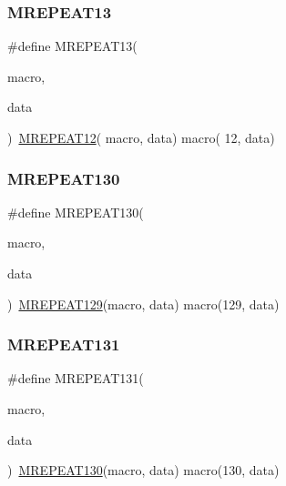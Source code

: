 \mbox{\label{group__group__sam0__utils__mrepeat_ga235cc5c4e4fb84c9d44ee4b5b5b4a7d1}} 
\subsubsection{\texorpdfstring{MREPEAT13}{MREPEAT13}}
{\footnotesize\ttfamily \#define M\+R\+E\+P\+E\+A\+T13(\begin{DoxyParamCaption}\item[{}]{macro,  }\item[{}]{data }\end{DoxyParamCaption})~\mbox{\hyperlink{group__group__sam0__utils__mrepeat_ga5e8405725939e1548f4c09088bb9284a}{M\+R\+E\+P\+E\+A\+T12}}( macro, data)   macro( 12, data)}

\mbox{\label{group__group__sam0__utils__mrepeat_ga4191567eafa92f00f44b2d84415d6364}} 
\subsubsection{\texorpdfstring{MREPEAT130}{MREPEAT130}}
{\footnotesize\ttfamily \#define M\+R\+E\+P\+E\+A\+T130(\begin{DoxyParamCaption}\item[{}]{macro,  }\item[{}]{data }\end{DoxyParamCaption})~\mbox{\hyperlink{group__group__sam0__utils__mrepeat_ga7842d9600b24d29d82636afa3f0ca4b8}{M\+R\+E\+P\+E\+A\+T129}}(macro, data)   macro(129, data)}

\mbox{\label{group__group__sam0__utils__mrepeat_ga6171f95e704d4bc6b92bca58bf15445c}} 
\subsubsection{\texorpdfstring{MREPEAT131}{MREPEAT131}}
{\footnotesize\ttfamily \#define M\+R\+E\+P\+E\+A\+T131(\begin{DoxyParamCaption}\item[{}]{macro,  }\item[{}]{data }\end{DoxyParamCaption})~\mbox{\hyperlink{group__group__sam0__utils__mrepeat_ga4191567eafa92f00f44b2d84415d6364}{M\+R\+E\+P\+E\+A\+T130}}(macro, data)   macro(130, data)}

